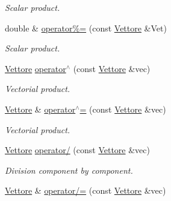\begin{DoxyCompactItemize}
\begin{DoxyCompactList}\small\item\em \-Scalar product. \end{DoxyCompactList}\item 
\hypertarget{classVettore_a478ce9f6aea546ba5e51de78f481e9a2}{double \& \hyperlink{classVettore_a478ce9f6aea546ba5e51de78f481e9a2}{operator\%=} (const \hyperlink{classVettore}{\-Vettore} \&\-Vet)}\label{classVettore_a478ce9f6aea546ba5e51de78f481e9a2}

\begin{DoxyCompactList}\small\item\em \-Scalar product. \end{DoxyCompactList}\item 
\hypertarget{classVettore_a41cbdc407d57951a3a979cef317773e8}{\hyperlink{classVettore}{\-Vettore} \hyperlink{classVettore_a41cbdc407d57951a3a979cef317773e8}{operator$^\wedge$} (const \hyperlink{classVettore}{\-Vettore} \&vec)}\label{classVettore_a41cbdc407d57951a3a979cef317773e8}

\begin{DoxyCompactList}\small\item\em \-Vectorial product. \end{DoxyCompactList}\item 
\hypertarget{classVettore_a2680ccae9c643e24af0edacd4c1e6d46}{\hyperlink{classVettore}{\-Vettore} \& \hyperlink{classVettore_a2680ccae9c643e24af0edacd4c1e6d46}{operator$^\wedge$=} (const \hyperlink{classVettore}{\-Vettore} \&vec)}\label{classVettore_a2680ccae9c643e24af0edacd4c1e6d46}

\begin{DoxyCompactList}\small\item\em \-Vectorial product. \end{DoxyCompactList}\item 
\hypertarget{classVettore_aab8ad16c726ce7a08cfd9425aea42326}{\hyperlink{classVettore}{\-Vettore} \hyperlink{classVettore_aab8ad16c726ce7a08cfd9425aea42326}{operator/} (const \hyperlink{classVettore}{\-Vettore} \&vec)}\label{classVettore_aab8ad16c726ce7a08cfd9425aea42326}

\begin{DoxyCompactList}\small\item\em \-Division component by component. \end{DoxyCompactList}\item 
\hypertarget{classVettore_a21800796b8c71b2fbde47de0f4bca118}{\hyperlink{classVettore}{\-Vettore} \& \hyperlink{classVettore_a21800796b8c71b2fbde47de0f4bca118}{operator/=} (const \hyperlink{classVettore}{\-Vettore} \&vec)}\label{classVettore_a21800796b8c71b2fbde47de0f4bca118}


\end{DoxyCompactItemize}
